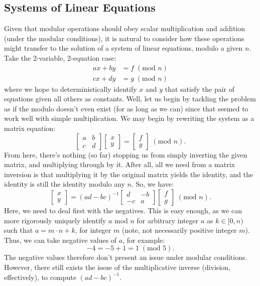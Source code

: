 \documentclass{article}
\begin{document}
\subsection{Systems of Linear Equations}
Given that modular operations should obey scalar multiplication and addition (under the modular conditions), it is natural to consider how these operations might transfer to the solution of a system of linear equations, modulo a given $n$. Take the 2-variable, 2-equation case:
\begin{align*}
    ax + by &= f \; (\text{mod } n) \\
    cx + dy &= g \; (\text{mod } n)
\end{align*}
where we hope to deterministically identify $x$ and $y$ that satisfy the pair of equations given all others as constants. Well, let us begin by tackling the problem as if the modulo doesn't even exist (for as long as we can) since that seemed to work well with simple multiplication. We may begin by rewriting the system as a matrix equation:
\[
    \begin{bmatrix}
        a & b \\
        c & d
    \end{bmatrix} \begin{bmatrix}
        x \\
        y
    \end{bmatrix} = \begin{bmatrix}
        f \\
        g
    \end{bmatrix} \; (\text{mod } n).
\]
From here, there's nothing (so far) stopping us from simply inverting the given matrix, and multiplying through by it. After all, all we need from a matrix inversion is that multiplying it by the original matrix yields the identity, and the identity is still the identity modulo any $n$. So, we have:
\[
    \begin{bmatrix}
        x \\
        y
    \end{bmatrix} = (ad - bc)^{-1} \begin{bmatrix}
        d & -b \\
        -c & a
    \end{bmatrix} \begin{bmatrix}
        f \\
        g
    \end{bmatrix} \; (\text{mod } n).
\]
Here, we need to deal first with the negatives. This is easy enough, as we can more rigorously uniquely identify $a$ mod $n$ for arbitrary integer $a$ as $k \in [0, n)$ such that $a = m \cdot n + k$, for integer $m$ (note, not necessarily positive integer $m$). Thus, we can take negative values of $a$, for example:
\[
    -4 = -5 + 1 = 1 \; (\text{mod } 5).
\]
The negative values therefore don't present an issue under modular conditions. However, there still exists the issue of the multiplicative inverse (division, effectively), to compute $(ad - bc)^{-1}$.
\end{document}
